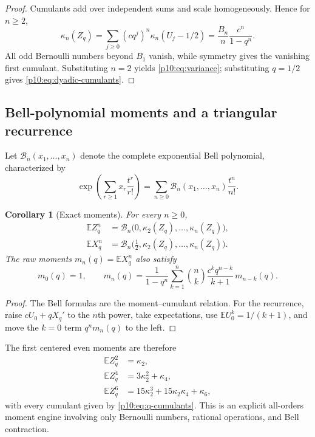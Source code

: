 \documentclass[11pt]{article}
\numberwithin{equation}{section}
\newtheorem{corollary}[theorem]{Corollary}
\theoremstyle{definition}
\theoremstyle{remark}
\newcommand{\E}{\mathbb E}
\begin{document}
\begin{proof}
Cumulants add over independent sums and scale homogeneously.  Hence for $n\ge2$,
\[
 \kappa_n(Z_q)
 =\sum_{j\ge0}(cq^j)^n\kappa_n(U_j-1/2)
 =\frac{B_n}{n}\frac{c^n}{1-q^n}.
\]
All odd Bernoulli numbers beyond $B_1$ vanish, while symmetry gives the vanishing first
cumulant.  Substituting $n=2$ yields \eqref{p10:eq:variance}; substituting $q=1/2$ gives
\eqref{p10:eq:dyadic-cumulants}.
\end{proof}

\subsection{Bell-polynomial moments and a triangular recurrence}

Let $\mathcal B_n(x_1,\ldots,x_n)$ denote the complete exponential Bell polynomial,
characterized by
\[
 \exp\left(\sum_{r\ge1}x_r\frac{t^r}{r!}\right)
 =\sum_{n\ge0}\mathcal B_n(x_1,\ldots,x_n)\frac{t^n}{n!}.
\]

\begin{corollary}[Exact moments]
\label{p10:cor:bell-moments}
For every $n\ge0$,
\begin{align}
 \E Z_q^n
 &=\mathcal B_n\bigl(0,\kappa_2(Z_q),\ldots,\kappa_n(Z_q)\bigr),  \label{p10:eq:centered-bell}\\
 \E X_q^n
 &=\mathcal B_n\bigl(\tfrac12,\kappa_2(Z_q),\ldots,\kappa_n(Z_q)\bigr). \label{p10:eq:raw-bell}
\end{align}
The raw moments $m_n(q)=\E X_q^n$ also satisfy
\begin{equation}
 m_0(q)=1,
 \qquad
 m_n(q)=\frac{1}{1-q^n}
 \sum_{k=1}^{n}\binom nk\frac{c^kq^{n-k}}{k+1}\,m_{n-k}(q).  \label{p10:eq:moment-recurrence}
\end{equation}
\end{corollary}

\begin{proof}
The Bell formulas are the moment--cumulant relation.  For the recurrence, raise
$cU_0+qX_q'$ to the $n$th power, take expectations, use $\E U_0^k=1/(k+1)$, and move the
$k=0$ term $q^nm_n(q)$ to the left.
\end{proof}

The first centered even moments are therefore
\begin{align*}
 \E Z_q^2&=\kappa_2,\\
 \E Z_q^4&=3\kappa_2^2+\kappa_4,\\
 \E Z_q^6&=15\kappa_2^3+15\kappa_2\kappa_4+\kappa_6,
\end{align*}
with every cumulant given by \eqref{p10:eq:q-cumulants}.  This is an explicit all-orders moment
engine involving only Bernoulli numbers, rational operations, and Bell contraction.
\end{document}

